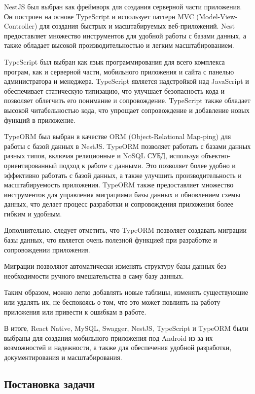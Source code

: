 NestJS \cite{NestJsGuide} был выбран как фреймворк для создания серверной части приложения.
Он построен на основе TypeScript и использует паттерн MVC (Model-View-Controller) для создания быстрых и масштабируемых веб-приложений.
Nest предоставляет множество инструментов для удобной работы с базами данных, а также обладает высокой производительностью и легким масштабированием.

TypeScript \cite{TypeScriptGuide} был выбран как язык программирования для всего комплекса програм,
как и серверной части, мобильного приложения и сайта с панелью администратора и менеджера.
TypeScript является надстройкой над JavaScript и обеспечивает статическую типизацию, что улучшает безопасность кода и позволяет облегчить его понимание и сопровождение.
TypeScript также обладает высокой читабельностью кода, что упрощает сопровождение и добавление новых функций в приложение.

TypeORM \cite{TypeORM} \cite{TypeOrmQueryRunner} был выбран в качестве ORM (Object-Relational Map-ping) для работы с базой данных в NestJS.
TypeORM позволяет работать с базами данных разных типов, включая реляционные и NoSQL СУБД, используя объектно-ориентированный подход к работе с данными.
Это позволяет более удобно и эффективно работать с базой данных, а также улучшить производительность и масштабируемость приложения.
TypeORM также предоставляет множество инструментов для управления миграциями базы данных и обновлением схемы данных, что делает процесс разработки и сопровождения приложения более гибким и удобным.

Дополнительно, следует отметить, что TypeORM позволяет создавать миграции базы данных,
что является очень полезной функцией при разработке и сопровождении приложения.

Миграции позволяют автоматически изменять структуру базы данных
без необходимости ручного вмешательства в саму базу данных.

Таким образом, можно легко добавлять новые таблицы,
изменять существующие или удалять их, не беспокоясь о том,
что это может повлиять на работу приложения или привести к ошибкам в работе.

В итоге, React Native, MySQL, Swagger, NestJS, TypeScript и TypeORM были выбраны для создания мобильного приложения под Android из-за их возможностей и надежности,
а также для обеспечения удобной разработки, документирования и масштабирования.

\newpage

\subsection{Постановка задачи}


